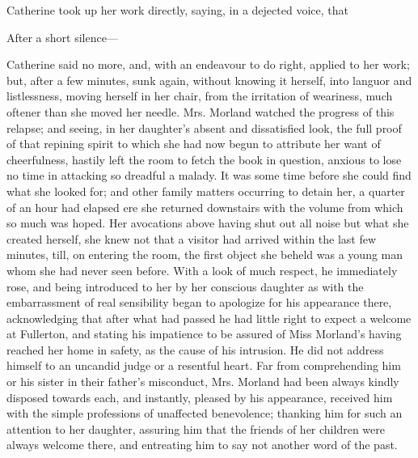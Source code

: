Catherine took up her work directly, saying, in a dejected voice, that 

 After a short silence---



Catherine said no more, and, with an endeavour to do right, applied to her work; but, after a few minutes, sunk again, without knowing it herself, into languor and listlessness, moving herself in her chair, from the irritation of weariness, much oftener than she moved her needle. Mrs. Morland watched the progress of this relapse; and seeing, in her daughter's absent and dissatisfied look, the full proof of that repining spirit to which she had now begun to attribute her want of cheerfulness, hastily left the room to fetch the book in question, anxious to lose no time in attacking so dreadful a malady. It was some time before she could find what she looked for; and other family matters occurring to detain her, a quarter of an hour had elapsed ere she returned downstairs with the volume from which so much was hoped. Her avocations above having shut out all noise but what she created herself, she knew not that a visitor had arrived within the last few minutes, till, on entering the room, the first object she beheld was a young man whom she had never seen before. With a look of much respect, he immediately rose, and being introduced to her by her conscious daughter as  with the embarrassment of real sensibility began to apologize for his appearance there, acknowledging that after what had passed he had little right to expect a welcome at Fullerton, and stating his impatience to be assured of Miss Morland's having reached her home in safety, as the cause of his intrusion. He did not address himself to an uncandid judge or a resentful heart. Far from comprehending him or his sister in their father's misconduct, Mrs. Morland had been always kindly disposed towards each, and instantly, pleased by his appearance, received him with the simple professions of unaffected benevolence; thanking him for such an attention to her daughter, assuring him that the friends of her children were always welcome there, and entreating him to say not another word of the past.

